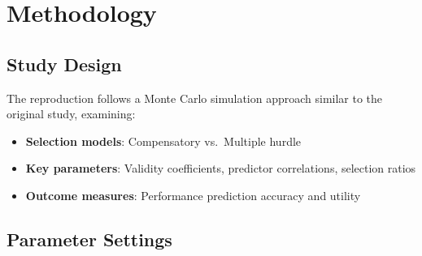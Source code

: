 \documentclass[
]{article}
\providecommand{\tightlist}{%
  \setlength{\itemsep}{0pt}\setlength{\parskip}{0pt}}
\begin{document}
\section{Methodology}\label{methodology}

\subsection{Study Design}\label{study-design}

The reproduction follows a Monte Carlo simulation approach similar to
the original study, examining:

\begin{itemize}
\tightlist
\item
  \textbf{Selection models}: Compensatory vs.~Multiple hurdle
\item
  \textbf{Key parameters}: Validity coefficients, predictor
  correlations, selection ratios
\item
  \textbf{Outcome measures}: Performance prediction accuracy and utility
\end{itemize}

\subsection{Parameter Settings}\label{parameter-settings}
\end{document}
